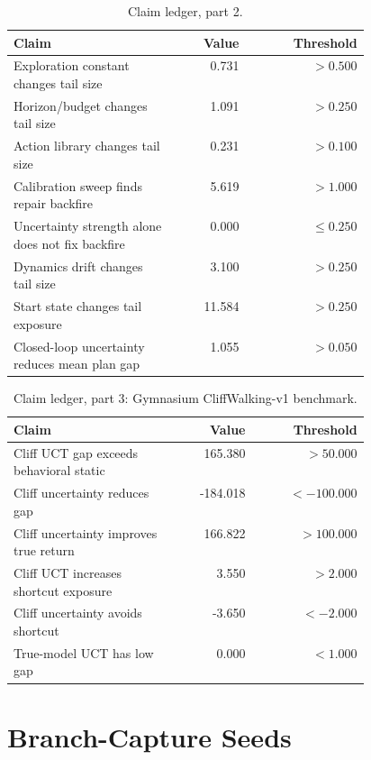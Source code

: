 \documentclass{article}
\begin{document}
\begin{table}[htbp]
\caption{Claim ledger, part 2.}
\label{tab:claim-ledger-b}
\begin{center}
\small
\begin{tabular}{p{0.46\linewidth}rr}
\toprule
Claim & Value & Threshold \\
\midrule
Exploration constant changes tail size & 0.731 & \(>0.500\) \\
Horizon/budget changes tail size & 1.091 & \(>0.250\) \\
Action library changes tail size & 0.231 & \(>0.100\) \\
Calibration sweep finds repair backfire & 5.619 & \(>1.000\) \\
Uncertainty strength alone does not fix backfire & 0.000 & \(\le0.250\) \\
Dynamics drift changes tail size & 3.100 & \(>0.250\) \\
Start state changes tail exposure & 11.584 & \(>0.250\) \\
Closed-loop uncertainty reduces mean plan gap & 1.055 & \(>0.050\) \\
\bottomrule
\end{tabular}
\end{center}
\end{table}

\begin{table}[htbp]
\caption{Claim ledger, part 3: Gymnasium CliffWalking-v1 benchmark.}
\label{tab:claim-ledger-c}
\begin{center}
\small
\begin{tabular}{p{0.46\linewidth}rr}
\toprule
Claim & Value & Threshold \\
\midrule
Cliff UCT gap exceeds behavioral static & 165.380 & \(>50.000\) \\
Cliff uncertainty reduces gap & -184.018 & \(<-100.000\) \\
Cliff uncertainty improves true return & 166.822 & \(>100.000\) \\
Cliff UCT increases shortcut exposure & 3.550 & \(>2.000\) \\
Cliff uncertainty avoids shortcut & -3.650 & \(<-2.000\) \\
True-model UCT has low gap & 0.000 & \(<1.000\) \\
\bottomrule
\end{tabular}
\end{center}
\end{table}

\section{Branch-Capture Seeds}
\end{document}
